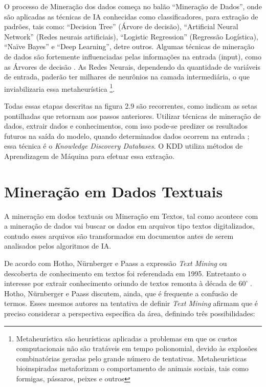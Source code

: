 O processo de Mineração dos dados começa no balão ``Mineração de Dados'', onde são aplicadas as técnicas de IA conhecidas como classificadores, para extração de padrões, tais como: 
``Decision Tree'' (Árvore de decisão), ``Artificial Neural Network'' (Redes neurais artificiais), ``Logistic Regression'' (Regressão Logística), ``Naïve Bayes'' e ``Deep Learning'', detre outros.
Algumas técnicas de mineração de dados são fortemente influenciadas pelas informações na entrada (input), como as Árvores de decisão \cite{DecisionTree}. 
As Redes Neurais, dependendo da quantidade de variáveis de entrada, paderão ter milhares de neurônios na camada intermediária, o que inviabilizaria essa metaheurística 
\footnote{Metaheurística são heurísticas aplicadas a problemas em que os custos computacionais não são tratáveis em tempo polionomial, devido às explosões combinatórias geradas
pelo grande número de tentativas. Metaheurísticas bioinspiradas metaforizam o comportamento de animais sociais, tais como formigas, pássaros, peixes e outros}.

Todas essas etapas descritas na figura 2.9 são recorrentes, como indicam as setas pontilhadas que retornam aos passos anteriores.
Utilizar técnicas de mineração de dados, extrair dados e conhecimentos, com isso pode-se predizer os resultados futuros na saída do modelo, 
quando determinados dados ocorrem na entrada \cite{Amin2015a}; essa técnica é o \textit{Knowledge Discovery Databases}.
O KDD utiliza métodos de Aprendizagem de Máquina para efetuar essa extração.




\section{Mineração em Dados Textuais} %

A mineração em dodos textuais ou Mineração em Textos, tal como acontece com a mineração de dados vai buscar os dados em arquivos tipo textos digitalizados, contudo esses arquivos são transformados em documentos antes de serem analisados pelos algoritmos de IA.

De acordo com Hotho, Nürnberger e Paass  \cite{hotho2005brief} a expressão \textit{Text Mining} ou descoberta de conhecimento em textos foi referendada em 1995. Entretanto o interesse por extrair conhecimento oriundo de textos remonta à década de 60' \cite{stone1968general}. Hotho, Nürnberger e Paass  \cite{hotho2005brief} discutem, ainda, que é frequente a confusão de termos. Esses mesmos autores \cite{hotho2005brief} na tentativa de definir \textit{Text Mining} afirmam que é preciso considerar a perspectiva específica da área, definindo três possibilidades:

